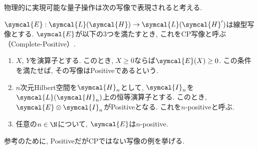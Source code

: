 

物理的に実現可能な量子操作は次の写像で表現されると考える. 

\begin{mydfn}[CP写像]\label{dfn.CP-map}
  $\symcal{E}:\symcal{L}(\symcal{H})\to\symcal{L}(\symcal{H}')$は線型写像とする. 
  $\symcal{E}$が以下の3つを満たすとき, これをCP写像と呼ぶ（Complete-Positive）. 
  \begin{enumerate}
    \item $X$, $Y$を演算子とする. 
    このとき, $X\geq 0$ならば$\symcal{E}(X)\geq 0$. 
    この条件を満たせば, その写像はPositiveであるという. 
    \item $n$次元Hilbert空間を$\symcal{H}_n$として, $\symcal{I}_n$を$\symcal{L}(\symcal{H}_n)$上の恒等演算子とする. 
    このとき, $\symcal{E}\otimes \symcal{I}_n$がPositiveとなる. 
    これを$n$-positiveと呼ぶ. 
    \item 任意の$n\in \N$について, $\symcal{E}$は$n$-positive. 
  \end{enumerate}
\end{mydfn}

参考のために, PositiveだがCPではない写像の例を挙げる. \\

